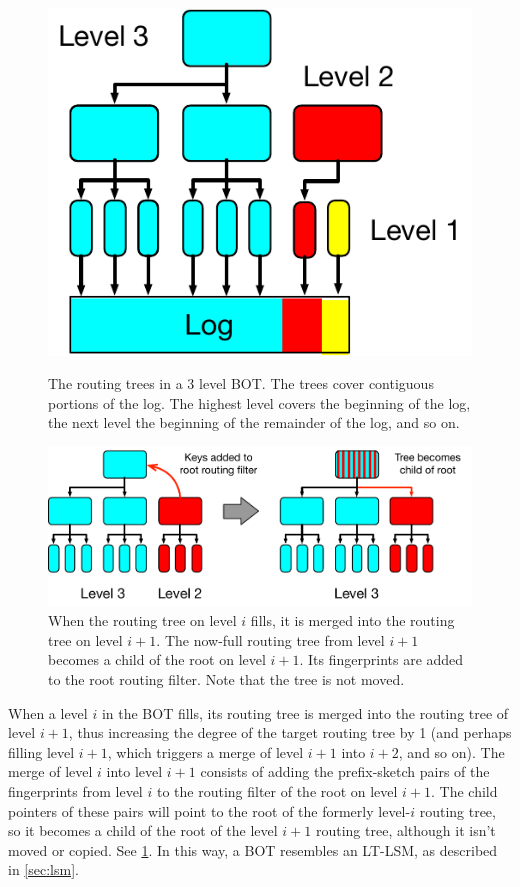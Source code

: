 \begin{figure}[h!]
	\centering
	\begin{minipage}[t]{0.4\textwidth}
		\centering
		\includegraphics[height=0.5\textwidth]{figures/routing_tree.pdf}
		\caption{The routing trees in a 3 level BOT. The trees
                  cover contiguous portions of the log.  The highest
                  level covers the beginning of the log, the next
                  level the beginning of the remainder of the log, and so on.}
		\label{fig:routing_tree}
	\end{minipage}\hfill
	\begin{minipage}[t]{0.55\textwidth}
		\centering
		\includegraphics[height=0.37\textwidth]{figures/routing_tree_merge.pdf}
		\caption{When the routing tree on level $i$ fills, it is merged into
			the routing tree on level $i+1$. The now-full routing tree from
			level $i+1$ becomes a child of the root on level $i+1$. Its
			fingerprints are added to the root routing filter. Note that the
			tree is not moved.}
		\label{fig:routing_tree_merge}
	\end{minipage}
\end{figure}

When a level $i$ in the BOT fills, its routing tree is merged into the routing
tree of level $i+1$, thus increasing the degree of the target routing tree by 1 (and
perhaps filling level $i+1$, which triggers a merge of level $i+1$ into
$i+2$, and so on). The merge of level $i$ into level $i+1$ consists of adding
the prefix-sketch pairs of the fingerprints from level $i$ to the routing
filter of the root on level $i+1$. The child pointers of these pairs will point
to the root of the formerly level-$i$ routing tree, so it becomes a child of
the root of the level $i+1$ routing tree, although it isn't moved or copied.
See \cref{fig:routing_tree_merge}. In this way, a BOT resembles an LT-LSM, as
described in \cref{sec:lsm}.

